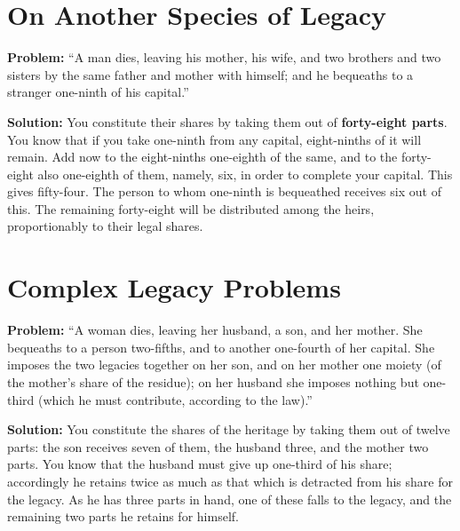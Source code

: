 \documentclass[11pt,a4paper,openany,oneside]{book}
\begin{document}
\begin{minipage}[t]{0.48\textwidth}
\raggedright

\section*{On Another Species of Legacy}

\textbf{Problem:} ``A man dies, leaving his mother, his wife, and two brothers and two sisters by the same father and mother with himself; and he bequeaths to a stranger one-ninth of his capital.''

\textbf{Solution:} You constitute their shares by taking them out of \textbf{forty-eight parts}. You know that if you take one-ninth from any capital, eight-ninths of it will remain. Add now to the eight-ninths one-eighth of the same, and to the forty-eight also one-eighth of them, namely, six, in order to complete your capital. This gives fifty-four. The person to whom one-ninth is bequeathed receives six out of this. The remaining forty-eight will be distributed among the heirs, proportionably to their legal shares.

\vspace{0.3cm}

\section*{Complex Legacy Problems}

\textbf{Problem:} ``A woman dies, leaving her husband, a son, and her mother. She bequeaths to a person two-fifths, and to another one-fourth of her capital. She imposes the two legacies together on her son, and on her mother one moiety (of the mother's share of the residue); on her husband she imposes nothing but one-third (which he must contribute, according to the law).''

\textbf{Solution:} You constitute the shares of the heritage by taking them out of twelve parts: the son receives seven of them, the husband three, and the mother two parts. You know that the husband must give up one-third of his share; accordingly he retains twice as much as that which is detracted from his share for the legacy. As he has three parts in hand, one of these falls to the legacy, and the remaining two parts he retains for himself.

\end{minipage}
\vspace{0.3cm}
\end{document}
